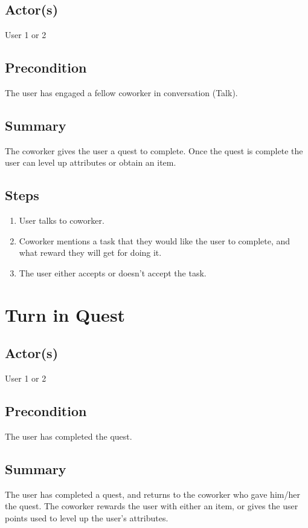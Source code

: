 \documentclass[12pt]{article}
\begin{document}
		\subsection{Actor(s)}
			User 1 or 2
			

		\subsection{Precondition}
				The user has engaged a fellow coworker in conversation (Talk).
	
		\subsection{Summary}
				The coworker gives the user a quest to complete. Once the quest is complete the user can level up attributes or obtain an item.
			\subsection{Steps}
			\begin{enumerate}
			\item User talks to coworker.
			\item Coworker mentions a task that they would like the user to complete, and what reward         they 			will get for doing it.
			\item The user either accepts or doesn't accept the task.
			
			\end{enumerate}



\section{Turn in Quest}
	

		\subsection{Actor(s)}
			User 1 or 2
			

		\subsection{Precondition}
				The user has completed the quest.
			
	
		\subsection{Summary}
				The user has completed a quest, and returns to the coworker who gave him/her the quest. The coworker rewards the user with either an item, or gives the user points used to level up the user's attributes.
\end{document}
